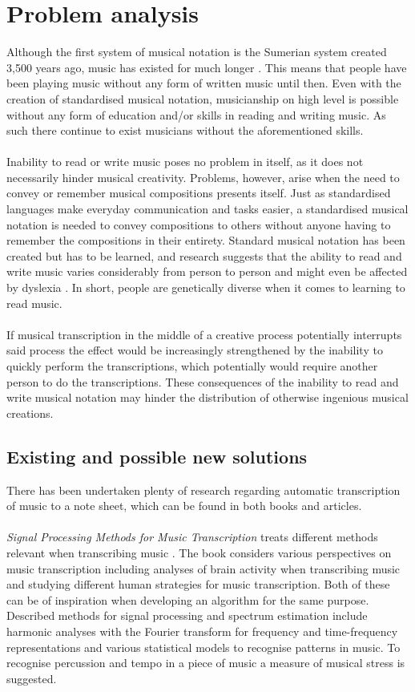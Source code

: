 \section{Problem analysis}
Although the first system of musical notation is the Sumerian system created 3,500 years ago, music has existed for much longer \cite{origins}. This means that people have been playing music without any form of written music until then. Even with the creation of standardised musical notation, musicianship on high level is possible without any form of education and/or skills in reading and writing music. As such there continue to exist musicians without the aforementioned skills. \\ \\
Inability to read or write music poses no problem in itself, as it does not necessarily hinder musical creativity. Problems, however, arise when the need to convey or remember musical compositions presents itself. Just as standardised languages make everyday communication and tasks easier, a standardised musical notation is needed to convey compositions to others without anyone having to remember the compositions in their entirety. Standard musical notation has been created but has to be learned, and research suggests that the ability to read and write music varies considerably from person to person and might even be affected by dyslexia \cite{dyslexia}. In short, people are genetically diverse when it comes to learning to read music.
\\ \\
If musical transcription in the middle of a creative process potentially interrupts said process the effect would be increasingly strengthened by the inability to quickly perform the transcriptions, which potentially would require another person to do the transcriptions. These consequences of the inability to read and write musical notation may hinder the distribution of otherwise ingenious musical creations.

\subsection{Existing and possible new solutions}
There has been undertaken plenty of research regarding automatic transcription of music to a note sheet, which can be found in both books and articles. 
\\ \\
\textit{Signal Processing Methods for Music Transcription} treats different methods relevant when transcribing music \cite{sol1}. 
The book considers various perspectives on music transcription including analyses of brain activity when transcribing music and studying different human strategies for music transcription. Both of these can be of inspiration when developing an algorithm for the same purpose. 
Described methods for signal processing and spectrum estimation include harmonic analyses with the Fourier transform for frequency and time-frequency representations and various statistical models to recognise patterns in music. 
To recognise percussion and tempo in a piece of music a measure of musical stress is suggested.

